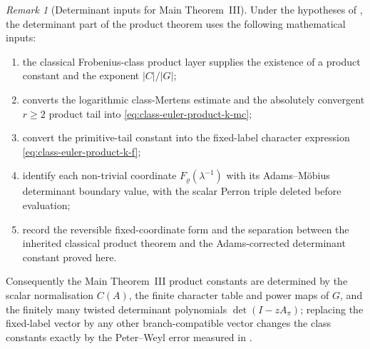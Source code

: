 \documentclass[11pt,a4paper]{amsart}
\theoremstyle{plain}
\theoremstyle{definition}
\theoremstyle{remark}
\newtheorem{remark}[theorem]{Remark}
\begin{document}
\begin{remark}[Determinant inputs for Main Theorem~III]
  \label{prop:main-iii-dependency-map}
  Under the hypotheses of , the
  determinant part of the product theorem uses the following mathematical
  inputs:
  \begin{enumerate}[label=\textup{(\roman*)},leftmargin=*]
    \item the classical Frobenius-class product layer supplies the existence
      of a product constant and the exponent \(|C|/|G|\);
    \item {} converts the logarithmic
      class-Mertens estimate and the absolutely convergent \(r\ge2\) product
      tail into \eqref{eq:class-euler-product-k-mc};
    \item {}
      convert the primitive-tail constant into the fixed-label character
      expression \eqref{eq:class-euler-product-k-f};
    \item {}
      identify each non-trivial coordinate
      \(F_\varrho(\lambda^{-1})\) with its Adams--M\"obius determinant
      boundary value, with the scalar Perron triple deleted before evaluation;
    \item {}
      record the reversible fixed-coordinate form and the separation between
      the inherited classical product theorem and the Adams-corrected
      determinant constant proved here.
  \end{enumerate}
  Consequently the Main Theorem~III product constants are determined by the
  scalar normalisation \(C(A)\), the finite character table and power maps of
  \(G\), and the finitely many twisted determinant polynomials
  \(\det(I-zA_\pi)\); replacing the fixed-label vector by any other
  branch-compatible vector changes the class constants exactly by the
  Peter--Weyl error measured in .
\end{remark}
\end{document}
